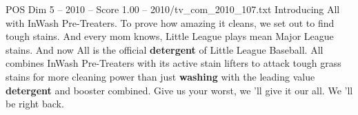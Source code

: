 \begin{textsample}{POS Dim 5 – 2010 – Score 1.00 – 2010/tv\_com\_2010\_107.txt}  \label{ex:f5_pos_076}
Introducing All with InWash Pre-Treaters.
To prove how amazing it cleans, we set out to find tough stains.
And every mom knows, Little League plays mean Major League stains.
And now All is the official \textbf{detergent} of Little League Baseball.
All combines InWash Pre-Treaters with its active stain lifters to attack tough grass stains for more cleaning power than just \textbf{washing} with the leading value \textbf{detergent} and booster combined.
Give us your worst, we 'll give it our all.
We 'll be right back.

\end{textsample}

